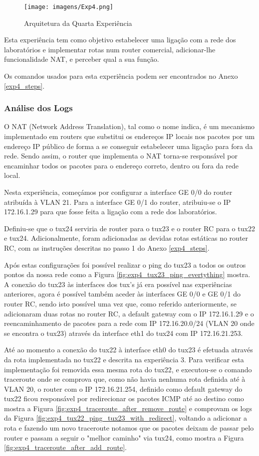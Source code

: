 \begin{figure}[h!]
\centering
\texttt{[image: imagens/Exp4.png]}
\caption{Arquitetura da Quarta Experiência}
\label{fig:exp4}
\end{figure}

Esta experiência tem como objetivo estabelecer uma ligação com a rede dos laboratórios e implementar rotas num router comercial, adicionar-lhe funcionalidade NAT, e perceber qual a sua função.

Os comandos usados para esta experiência podem ser encontrados no Anexo \ref{exp4_steps}.

\subsubsection{Análise dos Logs}

O NAT (Network Address Translation), tal como o nome indica, é um mecanismo implementado em routers que substitui os endereços IP locais nos pacotes por um endereço IP público de forma a se conseguir estabelecer uma ligação para fora da rede. Sendo assim, o router que implementa o NAT torna-se responsável por encaminhar todos os pacotes para o endereço correto, dentro ou fora da rede local.

Nesta experiência, começámos por configurar a interface GE 0/0 do router \cite{cisco_config} atribuída à VLAN 21. Para a interface GE 0/1 do router, atribuiu-se o IP 172.16.1.29 para que fosse feita a ligação com a rede dos laboratórios.

Definiu-se que o tux24 serviria de router para o tux23 e o router RC para o tux22 e tux24. Adicionalmente, foram adicionadas as devidas rotas estáticas no router RC, com as instruções descritas no passo 1 do Anexo \ref{exp4_steps}.

Após estas configurações foi possível realizar o ping do tux23 a todos os outros pontos da nossa rede como a Figura \ref{fig:exp4_tux23_ping_evertything} mostra. A conexão do tux23 às interfaces dos tux's já era possível nas experiências anteriores, agora é possível também aceder às interfaces GE 0/0 e GE 0/1 do router RC, sendo isto possível uma vez que, como referido anteriormente, se adicionaram duas rotas no router RC, a default gateway com o IP 172.16.1.29 e o reencaminhamento de pacotes para a rede com IP 172.16.20.0/24 (VLAN 20 onde se encontra o tux23) através da interface eth1 do tux24 com IP 172.16.21.253.

Até ao momento a conexão do tux22 à interface eth0 do tux23 é efetuada através da rota implementada no tux22 e descrita na experiência 3. Para verificar esta implementação foi removida essa mesma rota do tux22, e executou-se o comando traceroute onde se comprova que, como não havia nenhuma rota definida até à VLAN 20, o router com o IP 172.16.21.254, definido como default gateway do tux22 ficou responsável por redirecionar os pacotes ICMP até ao destino como mostra a Figura \ref{fig:exp4_traceroute_after_remove_route} e comprovam os logs da Figura \ref{fig:exp4_tux22_ping_tux23_with_redirect}, voltando a adicionar a rota e fazendo um novo traceroute notamos que os pacotes deixam de passar pelo router e passam a seguir o "melhor caminho" via tux24, como mostra a Figura \ref{fig:exp4_traceroute_after_add_route}.

